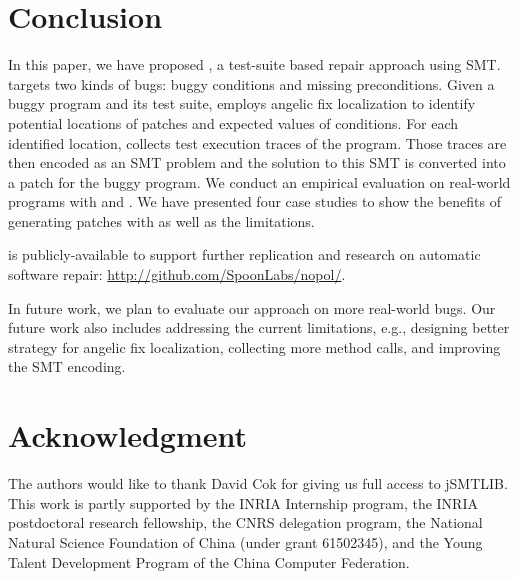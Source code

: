 \section{Conclusion}
\label{sect:conclusion}

In this paper, we have proposed \nopol, a test-suite based repair approach using SMT. \nopol targets two kinds of bugs: buggy \ourif conditions and missing preconditions. Given a buggy program and its test suite, \nopol employs angelic fix localization to identify potential locations of patches and expected values of \ourif conditions. For each identified location, \nopol collects test execution traces of the program. Those traces are then encoded as an SMT problem and the solution to this SMT is converted into a patch for the buggy program. We conduct an empirical evaluation on \numbug real-world programs with \buggyconditions and \preconditions. We have presented four case studies to show the benefits of generating patches with \nopol as well as the limitations. 

\nopol is publicly-available to support further replication and research on automatic software repair: \url{http://github.com/SpoonLabs/nopol/}.

In future work, we plan to evaluate our approach on more real-world bugs. Our future work also includes addressing the current limitations, e.g., designing better strategy for angelic fix localization, collecting more method calls, and improving the SMT encoding. 

\section*{Acknowledgment}

The authors would like to thank David Cok for giving us full access to jSMTLIB. 
This work is partly supported by the INRIA Internship program, the INRIA postdoctoral research fellowship, the CNRS delegation program, the National Natural Science Foundation of China (under grant 61502345), and the Young Talent Development Program of the China Computer Federation. 

\balance

